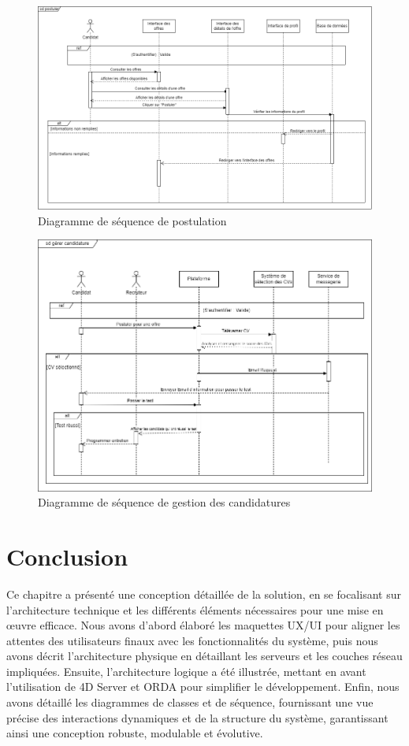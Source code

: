 \begin{figure}[htbp]
   \centering
   \includegraphics[scale=0.6]{Images/postuler.png} %
   \caption{Diagramme de séquence de postulation}
   \label{fig:seq3}
\end{figure}

\begin{figure}[htbp]
   \centering
   \includegraphics[scale=0.8]{Images/gererCandidature.png} %
   \caption{ Diagramme de séquence de gestion des candidatures}
   \label{fig:seq4}
\end{figure}


\section{Conclusion}
Ce chapitre a présenté une conception détaillée 
de la solution, en se focalisant sur l'architecture 
technique et les différents éléments nécessaires 
pour une mise en œuvre efficace. Nous avons d'abord 
élaboré les maquettes UX/UI pour aligner les attentes 
des utilisateurs finaux avec les fonctionnalités 
du système, puis nous avons décrit l'architecture 
physique en détaillant les serveurs et les couches 
réseau impliquées. Ensuite, l'architecture logique 
a été illustrée, mettant en avant l'utilisation de 
4D Server et ORDA pour simplifier le développement. 
Enfin, nous avons détaillé les diagrammes de classes et de séquence, fournissant une vue précise des interactions dynamiques et de la structure du système, garantissant ainsi une conception robuste, modulable et évolutive.
